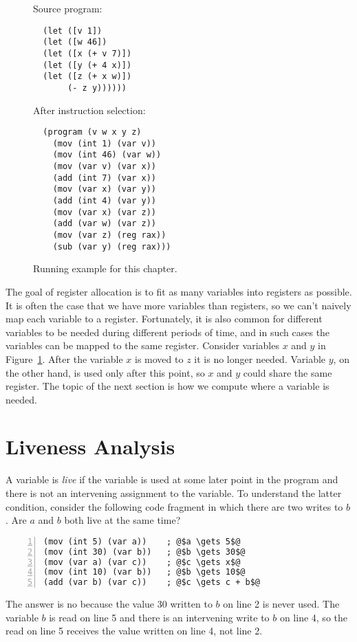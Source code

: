 \documentclass[12pt]{book}
\begin{document}
\begin{figure}
\begin{minipage}{0.45\textwidth}
Source program:
\begin{lstlisting}
  (let ([v 1])
  (let ([w 46])
  (let ([x (+ v 7)])
  (let ([y (+ 4 x)])
  (let ([z (+ x w)])
       (- z y))))))
\end{lstlisting}
\end{minipage}
\begin{minipage}{0.45\textwidth}
After instruction selection:
\begin{lstlisting}
  (program (v w x y z)
    (mov (int 1) (var v))
    (mov (int 46) (var w))
    (mov (var v) (var x))
    (add (int 7) (var x))
    (mov (var x) (var y))
    (add (int 4) (var y))
    (mov (var x) (var z))
    (add (var w) (var z))
    (mov (var z) (reg rax))
    (sub (var y) (reg rax)))
\end{lstlisting}
\end{minipage}
\caption{Running example for this chapter.}
\label{fig:reg-eg}
\end{figure}

The goal of register allocation is to fit as many variables into
registers as possible. It is often the case that we have more
variables than registers, so we can't naively map each variable to a
register. Fortunately, it is also common for different variables to be
needed during different periods of time, and in such cases the
variables can be mapped to the same register.  Consider variables $x$
and $y$ in Figure~\ref{fig:reg-eg}.  After the variable $x$ is moved
to $z$ it is no longer needed.  Variable $y$, on the other hand, is
used only after this point, so $x$ and $y$ could share the same
register. The topic of the next section is how we compute where a
variable is needed.


\section{Liveness Analysis}

A variable is \emph{live} if the variable is used at some later point
in the program and there is not an intervening assignment to the
variable.
%
To understand the latter condition, consider the following code
fragment in which there are two writes to $b$. Are $a$ and
$b$ both live at the same time? 
\begin{lstlisting}[numbers=left,numberstyle=\tiny]
(mov (int 5) (var a))    ; @$a \gets 5$@
(mov (int 30) (var b))   ; @$b \gets 30$@
(mov (var a) (var c))    ; @$c \gets x$@
(mov (int 10) (var b))   ; @$b \gets 10$@
(add (var b) (var c))    ; @$c \gets c + b$@
\end{lstlisting}
The answer is no because the value $30$ written to $b$ on line 2 is
never used. The variable $b$ is read on line 5 and there is an
intervening write to $b$ on line 4, so the read on line 5 receives the
value written on line 4, not line 2.
\end{document}
